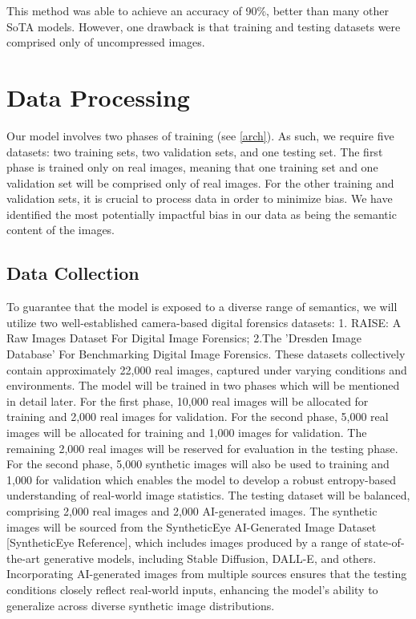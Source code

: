 \documentclass{article} %
\begin{document}
This method was able to achieve an accuracy of 90\%, better than many other SoTA models. However, one drawback is that training and testing datasets were comprised only of uncompressed images.

\section{Data Processing}
\label{data}
Our model involves two phases of training (see \ref{arch}). As such, we require five datasets: two training sets, two validation sets, and one testing set. The first phase is trained only on real images, meaning that one training set and one validation set will be comprised only of real images. For the other training and validation sets, it is crucial to process data in order to minimize bias. We have identified the most potentially impactful bias in our data as being the semantic content of the images.

\subsection{Data Collection}
\label{data_coll}
To guarantee that the model is exposed to a diverse range of semantics, we will utilize two well-established camera-based digital forensics datasets: 1. RAISE: A Raw Images Dataset For Digital Image Forensics; 2.The 'Dresden Image Database' For Benchmarking Digital Image Forensics. These datasets collectively contain approximately 22,000 real images, captured under varying conditions and environments. The model will be trained in two phases which will be mentioned in detail later. For the first phase, 10,000 real images will be allocated for training and 2,000 real images for validation. For the second phase, 5,000 real images will be allocated for training and 1,000 images for validation. The remaining 2,000 real images will be reserved for evaluation in the testing phase. For the second phase, 5,000 synthetic images will also be used to training and 1,000 for validation which enables the model to develop a robust entropy-based understanding of real-world image statistics.
The testing dataset will be balanced, comprising 2,000 real images and 2,000 AI-generated images. The synthetic images will be sourced from the SyntheticEye AI-Generated Image Dataset [SyntheticEye Reference], which includes images produced by a range of state-of-the-art generative models, including Stable Diffusion, DALL-E, and others. Incorporating AI-generated images from multiple sources ensures that the testing conditions closely reflect real-world inputs, enhancing the model's ability to generalize across diverse synthetic image distributions.
\end{document}
